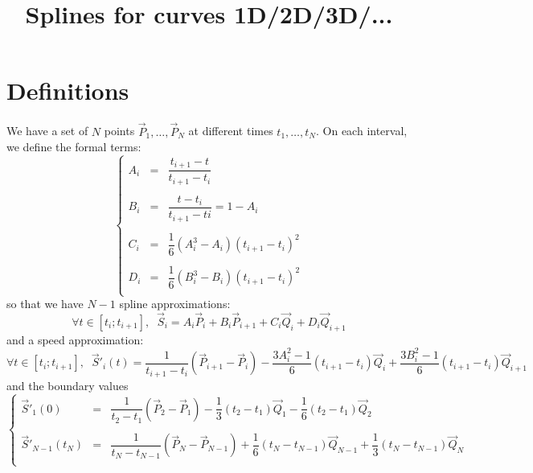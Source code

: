 \documentclass[aps,10pt]{revtex4}
\begin{document}
\title{Splines for curves 1D/2D/3D/...}
\maketitle

\section{Definitions}
We have a set of $N$ points $\vec{P}_1,\ldots,\vec{P}_N$ at different times $t_1,\ldots,t_N$.
On each interval, we define the formal terms:
\begin{equation}
\left\lbrace
\begin{array}{rcl}
	A_i & = &\dfrac{t_{i+1}-t}{t_{i+1}-t_{i}}\\
	\\
	B_i & = &\dfrac{t-t_{i}}{t_{i+1}-t{i}} = 1-A_i\\
	\\
	C_i & = & \dfrac{1}{6}\left(A_i^3-A_i\right)\left(t_{i+1}-t_{i}\right)^2\\
	\\
	D_i & = & \dfrac{1}{6}\left(B_i^3-B_i\right)\left(t_{i+1}-t_{i}\right)^2\\
\end{array}
\right.
\end{equation}
so that we have  $N-1$ spline approximations:
\begin{equation}
	\forall t \in [t_{i};t_{i+1}], \;\; \vec{S}_i = A_i \vec{P}_{i} + B_i \vec{P}_{i+1} + C_i \vec{Q}_i + D_i \vec{Q}_{i+1}
\end{equation}
and a speed approximation:
\begin{equation}	
		\forall t \in [t_{i};t_{i+1}],
		 \;\; \vec{S}'_i(t) = 
		 \dfrac{1}{t_{i+1}-t_{i}} \left(\vec{P}_{i+1}-\vec{P}_i\right)
		  - \dfrac{3A_i^2-1}{6}(t_{i+1}-t_{i}) \vec{Q}_i
		  + \dfrac{3B_i^2-1}{6}(t_{i+1}-t_{i}) \vec{Q}_{i+1}
\end{equation}
and the boundary values
\begin{equation}
\left\lbrace
\begin{array}{rcl}
	\vec{S}'_1(0) & = & \dfrac{1}{t_{2}-t_{1}} \left(\vec{P}_{2}-\vec{P}_1\right)
		  - \dfrac{1}{3}(t_{2}-t_{1}) \vec{Q}_1
		  - \dfrac{1}{6}(t_{2}-t_{1}) \vec{Q}_{2}\\
		  \\
		 \vec{S}'_{N-1}(t_N) & = &  \dfrac{1}{t_{N}-t_{N-1}} \left(\vec{P}_{N}-\vec{P}_{N-1}\right)  + \dfrac{1}{6}(t_{N}-t_{N-1}) \vec{Q}_{N-1}
		  + \dfrac{1}{3}(t_{N}-t_{N-1}) \vec{Q}_{N} \\
\end{array}
\right.
\end{equation}
\end{document}
